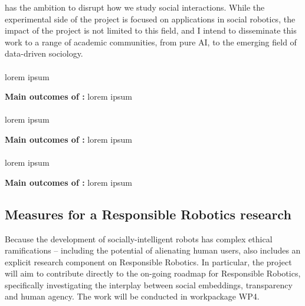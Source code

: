 \project has the ambition to disrupt how we study social interactions. While
the experimental side of the project is focused on applications in social
robotics, the impact of the project is not limited to this field, and I intend
to disseminate this work to a range of academic communities, from pure AI, to
the emerging field of data-driven sociology.


\paragraph{\TZA}

lorem ipsum

\begin{framed}
    {\noindent\bf Main outcomes of \tZA:} lorem ipsum 
\end{framed}

\paragraph{\TZB}

lorem ipsum

\begin{framed}
    {\noindent\bf Main outcomes of \tZB:} lorem ipsum 
\end{framed}

\paragraph{\TZC}

lorem ipsum

\begin{framed}
    {\noindent\bf Main outcomes of \tZC:} lorem ipsum 
\end{framed}




\subsection{Measures for a Responsible Robotics research}


Because the development of socially-intelligent robots has
complex ethical ramifications -- including the potential of alienating
human users, \project also includes an explicit research component on
Responsible Robotics. In particular, the project will aim to contribute directly
to the on-going roadmap for Responsible Robotics, specifically
investigating the interplay between social embeddings, transparency and human
agency. The work will be conducted in workpackage WP4.


